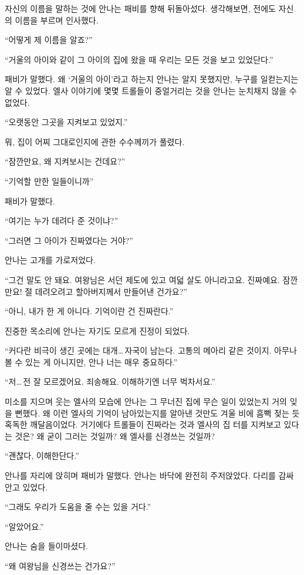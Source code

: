 자신의 이름을 말하는 것에 안나는 패비를 향해 뒤돌아섰다. 생각해보면, 전에도 자신의 이름을 부르며 인사했다.

``어떻게 제 이름을 알죠?''

``거울의 아이와 같이 그 아이의 집에 왔을 때 우리는 모든 것을 보고 있었단다.''

패비가 말했다. 왜 `거울의 아이'라고 하는지 안나는 알지 못했지만, 누구를 일컫는지는 알 수 있었다. 엘사 이야기에 몇몇 트롤들이 중얼거리는 것을 안나는 눈치채지 않을 수 없었다.

``오랫동안 그곳을 지켜보고 있었지.''

뭐, 집이 어찌 그대로인지에 관한 수수께끼가 풀렸다.

``잠깐만요, 왜 지켜보시는 건데요?''

``기억할 만한 일들이니까''

패비가 말했다.

``여기는 누가 데려다 준 것이냐?''

``그러면 그 아이가 진짜였다는 거야?''

안나는 고개를 가로저었다.

``그건 말도 안 돼요. 여왕님은 서던 제도에 있고 여덟 살도 아니라고요. 진짜예요. 잠깐만요! 절 데려오려고 할아버지께서 만들어낸 건가요?''

``아니, 내가 한 게 아니다. 기억이란 건 진짜란다.''

진중한 목소리에 안나는 자기도 모르게 진정이 되었다.

``커다란 비극이 생긴 곳에는 대개\ldots\,자국이 남는다. 고통의 메아리 같은 것이지. 아무나 볼 수 있는 게 아니지만, 안나 너는 매우 중요하다.''

``저\ldots\,전 잘 모르겠어요. 죄송해요. 이해하기엔 너무 벅차서요.''

미소를 지으며 웃는 엘사의 모습에 안나는 그 무너진 집에 무슨 일이 있었는지 거의 잊을 뻔했다. 왜 이런 엘사의 기억이 남아있는지를 알아낸 것만도 겨울 비에 흠뻑 젖는 듯 혹독한 깨달음이었다. 거기에다 트롤들이 진짜라는 것과 엘사의 집 터를 지켜보고 있다는 것은? 왜 굳이 그러는 것일까? 왜 엘사를 신경쓰는 것일까?

``괜찮다, 이해한단다.''

안나를 자리에 앉히며 패비가 말했다. 안나는 바닥에 완전히 주저앉았다. 다리를 감싸 안고 있었다.

``그래도 우리가 도움을 줄 수는 있을 거다.''

``알았어요.''

안나는 숨을 들이마셨다.

``왜 여왕님을 신경쓰는 건가요?''

